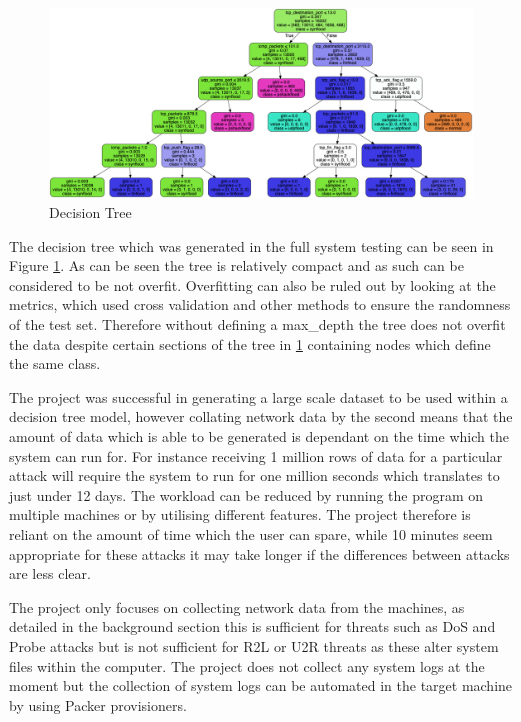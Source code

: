 \begin{figure}[H]
    \centering
    \includegraphics[scale=0.3]{Images/Results/tree.png}
    \caption{Decision Tree}
    \label{fig:dectres}
\end{figure}

The decision tree which was generated in the full system testing can be seen in Figure \ref{fig:dectres}. As can be seen the tree is relatively compact and as such can be considered to be not overfit. Overfitting can also be ruled out by looking at the metrics, which used cross validation and other methods to ensure the randomness of the test set. Therefore without defining a max\_depth the tree does not overfit the data despite certain sections of the tree in \ref{fig:dectres} containing nodes which define the same class.

The project was successful in generating a large scale dataset to be used within a decision tree model, however collating network data by the second means that the amount of data which is able to be generated is dependant on the time which the system can run for. For instance receiving 1 million rows of data for a particular attack will require the system to run for one million seconds which translates to just under 12 days. The workload can be reduced by running the program on multiple machines or by utilising different features. The project therefore is reliant on the amount of time which the user can spare, while 10 minutes seem appropriate for these attacks it may take longer if the differences between attacks are less clear.

The project only focuses on collecting network data from the machines, as detailed in the background section this is sufficient for threats such as DoS and Probe attacks but is not sufficient for R2L or U2R threats as these alter system files within the computer. The project does not collect any system logs at the moment but the collection of system logs can be automated in the target machine by using Packer provisioners.
